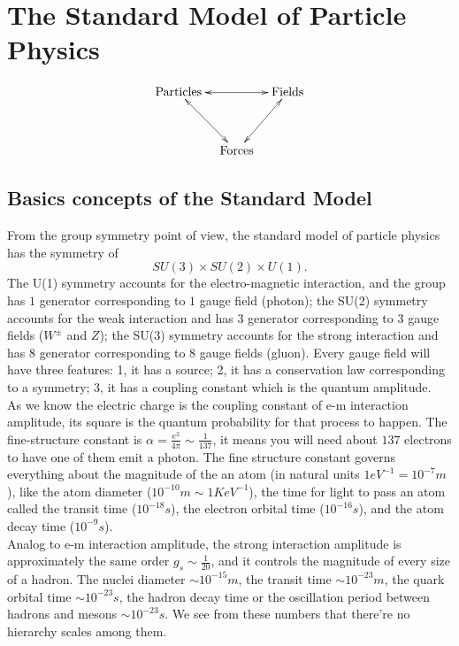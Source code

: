 \documentclass{article}
\newcommand{\subsec}{\subsection}
\newcommand{\be}{\begin{equation}}
\newcommand{\ee}{\end{equation}}
\renewcommand{\1}{\left}
\renewcommand{\2}{\right}
\newcommand{\al}{\alpha}
\begin{document}
\newpage
\section{The Standard Model of Particle Physics}
\be
\begin{gathered} \xymatrix@R=8ex@C=2ex{
\text{Particles} \ar@{<->}[rd] \ar@{<->}[rr]& &\text{Fields} \ar@{<->}[ld] \\
&\text{Forces}& \\
} \end{gathered}
\ee

\subsec{Basics concepts of the Standard Model}
From the group symmetry point of view, the standard model of particle physics has the symmetry of \be SU(3)\times SU(2) \times U(1).\ee The U(1) symmetry accounts for the electro-magnetic interaction, and the group has $1$ generator corresponding to $1$ gauge field (photon); the SU(2) symmetry accounts for the weak interaction and has $3$ generator corresponding to $3$ gauge fields ($W^\pm$ and $Z$); the SU(3) symmetry accounts for the strong interaction and has $8$ generator corresponding to $8$ gauge fields (gluon). Every gauge field will have three features: 1, it has a source; 2, it has a conservation law corresponding to a symmetry; 3, it has a coupling constant which is the quantum amplitude.\\

As we know the electric charge is the coupling constant of e-m interaction amplitude, its square is the quantum probability for that process to happen. The fine-structure constant is $\al=\frac{e^2}{4\pi}\sim \frac 1{137}$, it means you will need about $137$ electrons to have one of them emit a photon. The fine structure constant governs everything about the magnitude of the an atom (in natural units $1eV^{-1}=10^{-7}m$), like the atom diameter ($10^{-10}m\sim 1KeV^{-1}$), the time for light to pass an atom called the transit time ($10^{-18}s$), the electron orbital time ($10^{-16}s$), and the atom decay time ($10^{-9}s$).\\

Analog to e-m interaction amplitude, the strong interaction amplitude is approximately the same order $g_s\sim \frac1 {20}$, and it controls the magnitude of every size of a hadron. The nuclei diameter $\sim 10^{-15}m$, the transit time $\sim 10^{-23}m$, the quark orbital time $\sim 10^{-23}s$, the hadron decay time or the oscillation period between hadrons and mesons $\sim 10^{-23}s$. We see from these numbers that there're no hierarchy scales among them.\\
\end{document}
